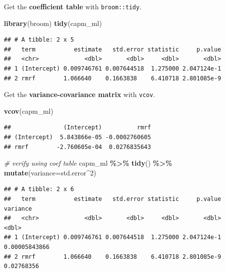 \documentclass[
  a4paper,
  twoside,
  openright]{book}
\newenvironment{Shaded}{\begin{snugshade}}{\end{snugshade}}
\newcommand{\AttributeTok}[1]{\textcolor[rgb]{0.13,0.29,0.53}{#1}}
\newcommand{\CommentTok}[1]{\textcolor[rgb]{0.56,0.35,0.01}{\textit{#1}}}
\newcommand{\DecValTok}[1]{\textcolor[rgb]{0.00,0.00,0.81}{#1}}
\newcommand{\FunctionTok}[1]{\textcolor[rgb]{0.13,0.29,0.53}{\textbf{#1}}}
\newcommand{\NormalTok}[1]{#1}
\newcommand{\SpecialCharTok}[1]{\textcolor[rgb]{0.81,0.36,0.00}{\textbf{#1}}}
\theoremstyle{definition}
\theoremstyle{definition}
\theoremstyle{definition}
\theoremstyle{definition}
\theoremstyle{remark}
\begin{document}
Get the \textbf{coefficient table} with \texttt{broom::tidy}.

\begin{Shaded}
\begin{Highlighting}[]
\FunctionTok{library}\NormalTok{(broom)}
\FunctionTok{tidy}\NormalTok{(capm\_ml)}
\end{Highlighting}
\end{Shaded}

\begin{verbatim}
## # A tibble: 2 x 5
##   term           estimate   std.error statistic     p.value
##   <chr>             <dbl>       <dbl>     <dbl>       <dbl>
## 1 (Intercept) 0.009746761 0.007644518  1.275000 2.047124e-1
## 2 rmrf        1.066640    0.1663838    6.410718 2.801085e-9
\end{verbatim}

Get the \textbf{variance-covariance matrix} with \texttt{vcov}.

\begin{Shaded}
\begin{Highlighting}[]
\FunctionTok{vcov}\NormalTok{(capm\_ml)}
\end{Highlighting}
\end{Shaded}

\begin{verbatim}
##               (Intercept)          rmrf
## (Intercept)  5.843866e-05 -0.0002760605
## rmrf        -2.760605e-04  0.0276835643
\end{verbatim}

\begin{Shaded}
\begin{Highlighting}[]
\CommentTok{\# verify using coef table}
\NormalTok{capm\_ml }\SpecialCharTok{\%\textgreater{}\%} 
    \FunctionTok{tidy}\NormalTok{() }\SpecialCharTok{\%\textgreater{}\%} 
    \FunctionTok{mutate}\NormalTok{(}\AttributeTok{variance=}\NormalTok{std.error}\SpecialCharTok{\^{}}\DecValTok{2}\NormalTok{)}
\end{Highlighting}
\end{Shaded}

\begin{verbatim}
## # A tibble: 2 x 6
##   term           estimate   std.error statistic     p.value      variance
##   <chr>             <dbl>       <dbl>     <dbl>       <dbl>         <dbl>
## 1 (Intercept) 0.009746761 0.007644518  1.275000 2.047124e-1 0.00005843866
## 2 rmrf        1.066640    0.1663838    6.410718 2.801085e-9 0.02768356
\end{verbatim}
\end{document}
